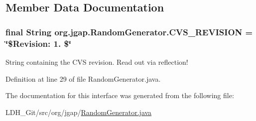 \subsection{Member Data Documentation}
\hypertarget{interfaceorg_1_1jgap_1_1_random_generator_a160f82fe77aae0cfc802a2db56b4ee44}{
\subsubsection[{C\-V\-S\-\_\-\-R\-E\-V\-I\-S\-I\-O\-N}]{\setlength{\rightskip}{0pt plus 5cm}final String org.\-jgap.\-Random\-Generator.\-C\-V\-S\-\_\-\-R\-E\-V\-I\-S\-I\-O\-N = \char`\"{}\$Revision\-: 1. \$\char`\"{}\hspace{0.3cm}{\ttfamily [static]}}}\label{interfaceorg_1_1jgap_1_1_random_generator_a160f82fe77aae0cfc802a2db56b4ee44}
String containing the C\-V\-S revision. Read out via reflection! 

Definition at line 29 of file Random\-Generator.\-java.



The documentation for this interface was generated from the following file\-:\begin{DoxyCompactItemize}
\item 
L\-D\-H\-\_\-\-Git/src/org/jgap/\hyperlink{_random_generator_8java}{Random\-Generator.\-java}\end{DoxyCompactItemize}
